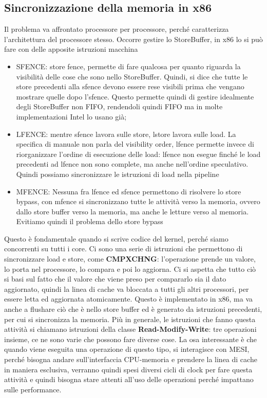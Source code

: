 \documentclass[14pt, oneside]{book}
\begin{document}
\subsection{Sincronizzazione della memoria in x86}
Il problema va affrontato processore per processore, perché caratterizza l'architettura del processore stesso. Occorre gestire lo StoreBuffer, in x86 lo si può fare con delle apposite istruzioni macchina
\begin{itemize}
\item SFENCE: store fence, permette di fare qualcosa per quanto riguarda la visibilità delle cose che sono nello StoreBuffer. Quindi, si dice che tutte le store precedenti alla sfence devono essere rese visibili prima che vengano mostrare quelle dopo l'sfence. Questo permette quindi di gestire idealmente degli StoreBuffer non FIFO, rendendoli quindi FIFO ma in molte implementazioni Intel lo usano già;
\item LFENCE: mentre sfence lavora sulle store, lstore lavora sulle load. La specifica di manuale non parla del visibility order, lfence permette invece di riorganizzare l'ordine di esecuzione delle load: lfence non esegue finché le load precedenti ad lfence non sono complete, ma anche nell'ordine speculativo. Quindi possiamo sincronizzare le istruzioni di load nella pipeline
\item MFENCE: Nessuna fra lfence ed sfence permettono di risolvere lo store bypass, con mfence si sincronizzano tutte le attività verso la memoria, ovvero dallo store buffer verso la memoria, ma anche le letture verso al memoria. Evitiamo quindi il problema dello store bypass
\end{itemize}
Questo è fondamentale quando si scrive codice del kernel, perché siamo concorrenti su tutti i core. Ci sono una serie di istruzioni che permettono di sincronizzare load e store, come \textbf{CMPXCHNG}: l'operazione prende un valore, lo porta nel processore, lo compara e poi lo aggiorna. Ci si aspetta che tutto ciò si basi sul fatto che il valore che viene preso per compararlo sia il dato aggiornato, quindi la linea di cache va bloccata a tutti gli altri processori, per essere letta ed aggiornata atomicamente. Questo è implementato in x86, ma va anche a flushare ciò che è nello store buffer ed è generato da istruzioni precedenti, per cui si sincronizza la memoria. Più in generale, le istruzioni che fanno questa attività si chiamano istruzioni della classe \textbf{Read-Modify-Write}: tre operazioni insieme, ce ne sono varie che possono fare diverse cose. La osa interessante è che quando viene eseguita una operazione di questo tipo, si interagisce con MESI, perché bisogna andare sull'interfaccia CPU-memoria e prendere la linea di cache in maniera esclusiva, verranno quindi spesi diversi cicli di clock per fare questa attività e quindi bisogna stare attenti all'uso delle operazioni perché impattano sulle performance.
\end{document}
